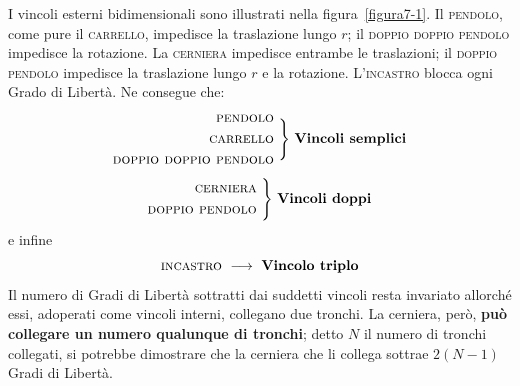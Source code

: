\noindent I vincoli esterni bidimensionali sono illustrati nella figura~\ref{figura7-1}. Il \textsc{pendolo}, come pure il \textsc{carrello}, impedisce la traslazione lungo $r$; il \textsc{doppio doppio pendolo} impedisce la rotazione. La \textsc{cerniera} impedisce entrambe le traslazioni; il \textsc{doppio pendolo} impedisce la traslazione lungo $r$ e la rotazione. L'\textsc{incastro} blocca ogni Grado di Libertà. Ne consegue che:
\begin{equation*}
\begin{aligned}
\textup{\textsc{pendolo}} & \\
\textup{\textsc{carrello}} & \\
\textup{\textsc{doppio doppio pendolo}} & 
\end{aligned}
\,\,\Biggr\}\,\, \textup{\textbf{Vincoli semplici}}
\end{equation*}
\begin{equation*}
\begin{aligned}
\textup{\textsc{cerniera}} & \\
\textup{\textsc{doppio pendolo}} & 
\end{aligned}
\,\,\Biggr\}\,\, \textup{\textbf{Vincoli doppi}}
\end{equation*}
\noindent e infine 
\begin{equation*}
\textup{\textsc{incastro}}\,\,\longrightarrow\,\, \textup{\textbf{Vincolo triplo}}
\end{equation*}
\noindent Il numero di Gradi di Libertà sottratti dai suddetti vincoli resta invariato allorché essi, adoperati come vincoli interni, collegano due tronchi. La cerniera, però, \textbf{può collegare un numero qualunque di tronchi}; detto $N$ il numero di tronchi collegati, si potrebbe dimostrare che la cerniera che li collega sottrae $2(N-1)$ Gradi di Libertà. 

